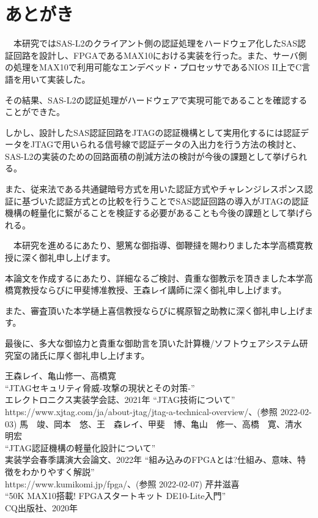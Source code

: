 \documentclass{thesis}
\begin{document}
\chapter{あとがき}
　本研究ではSAS-L2のクライアント側の認証処理をハードウェア化したSAS認証回路を設計し、FPGAであるMAX10における実装を行った。また、サーバ側の処理をMAX10で利用可能なエンデベッド・プロセッサであるNIOS II上でC言語を用いて実装した。\par
その結果、SAS-L2の認証処理がハードウェアで実現可能であることを確認することができた。\par
しかし、設計したSAS認証回路をJTAGの認証機構として実用化するには認証データをJTAGで用いられる信号線で認証データの入出力を行う方法の検討と、SAS-L2の実装のための回路面積の削減方法の検討が今後の課題として挙げられる。\par
また、従来法である共通鍵暗号方式を用いた認証方式やチャレンジレスポンス認証に基づいた認証方式との比較を行うことでSAS認証回路の導入がJTAGの認証機構の軽量化に繋がることを検証する必要があることも今後の課題として挙げられる。

\acknowledgement
　本研究を進めるにあたり、懇篤な御指導、御鞭撻を賜わりました本学高橋寛教授に深く御礼申し上げます。\par
本論文を作成するにあたり、詳細なるご検討、貴重な御教示を頂きました本学高橋寛教授ならびに甲斐博准教授、王森レイ講師に深く御礼申し上げます。\par
また、審査頂いた本学樋上喜信教授ならびに梶原智之助教に深く御礼申し上げます。\par
最後に、多大な御協力と貴重な御助言を頂いた計算機/ソフトウェアシステム研究室の諸氏に厚く御礼申し上げます。

\begin{thebibliography}{99}
王森レイ、亀山修一、高橋寛 \\
``JTAGセキュリティ脅威-攻撃の現状とその対策-''\\
エレクトロニクス実装学会誌、2021年
``JTAG技術について''\\
https://www.xjtag.com/ja/about-jtag/jtag-a-technical-overview/、(参照 2022-02-03)
馬　竣、岡本　悠、王　森レイ、甲斐　博、亀山　修一、高橋　寛、清水　明宏\\
``JTAG認証機構の軽量化設計について''\\
実装学会春季講演大会論文、2022年
``組み込みのFPGAとは?仕組み、意味、特徴をわかりやすく解説''\\
https://www.kumikomi.jp/fpga/、(参照 2022-02-07)
芹井滋喜\\
``50K MAX10搭載! FPGAスタートキット DE10-Lite入門''\\
CQ出版社、2020年
%
%
%
\end{thebibliography}



\end{document}
